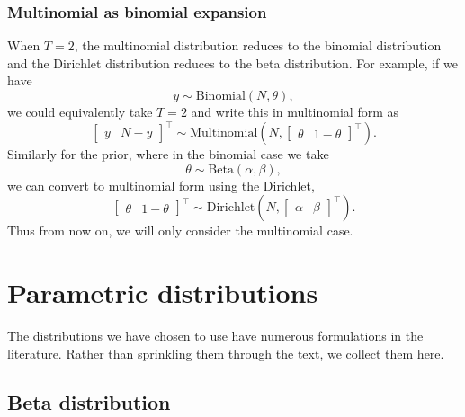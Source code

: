\documentclass[11pt]{report}
\begin{document}
\subsection{Multinomial as binomial expansion}

When $T = 2$, the multinomial distribution reduces to the binomial
distribution and the Dirichlet distribution reduces to the beta
distribution.  For example, if we have
\[
  y \sim \textrm{Binomial}(N, \theta),
\]
we could equivalently take $T = 2$ and write this in multinomial form
as
\[
  \begin{bmatrix} y & N - y \end{bmatrix}^{\top}
  \sim \textrm{Multinomial}\!\left(N,
    \begin{bmatrix} \theta & 1 - \theta \end{bmatrix}^{\top}\right).
\]
Similarly for the prior, where in the binomial case we take
\[
  \theta \sim \textrm{Beta}(\alpha, \beta),
\]
we can convert to multinomial form using the Dirichlet,
\[
  \begin{bmatrix} \theta & 1 - \theta \end{bmatrix}^{\top}
  \sim \textrm{Dirichlet}\!\left(N,
    \begin{bmatrix} \alpha & \beta \end{bmatrix}^{\top}\right).
\]
Thus from now on, we will only consider the multinomial case.






\nocite{aitchison1982statistical}
\nocite{gelman2012we}

\clearpage
{}
{}


\appendix

\chapter{Parametric distributions}\label{chap:distributions}

The distributions we have chosen to use have numerous formulations in
the literature.  Rather than sprinkling them through the text, we
collect them here.

\section{Beta distribution}\label{sec:beta-distribution}
\end{document}

